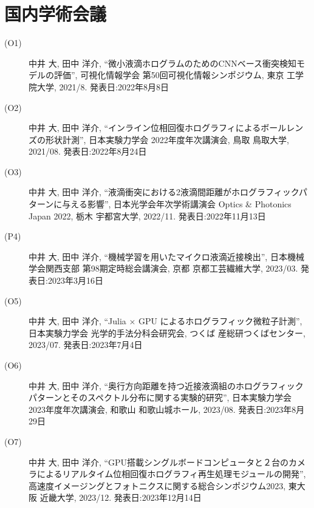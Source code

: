 \section*{国内学術会議}
\begin{description}
    \item[(O1)] 中井 大, 田中 洋介, “微小液滴ホログラムのためのCNNベース衝突検知モデルの評価”, 可視化情報学会 第50回可視化情報シンポジウム, 東京 工学院大学, 2021/8. 発表日:2022年8月8日
    \item[(O2)] 中井 大, 田中 洋介, “インライン位相回復ホログラフィによるボールレンズの形状計測”, 日本実験力学会 2022年度年次講演会, 鳥取 鳥取大学, 2021/08. 発表日:2022年8月24日
    \item[(O3)] 中井 大, 田中 洋介, “液滴衝突における2液滴間距離がホログラフィックパターンに与える影響”, 日本光学会年次学術講演会 Optics \& Photonics Japan 2022, 栃木 宇都宮大学, 2022/11. 発表日:2022年11月13日
    \item[(P4)] 中井 大, 田中 洋介, “機械学習を用いたマイクロ液滴近接検出”, 日本機械学会関西支部 第98期定時総会講演会, 京都 京都工芸繊維大学, 2023/03. 発表日:2023年3月16日
    \item[(O5)] 中井 大, 田中 洋介, “Julia × GPU によるホログラフィック微粒子計測”, 日本実験力学会 光学的手法分科会研究会, つくば 産総研つくばセンター, 2023/07. 発表日:2023年7月4日
    \item[(O6)] 中井 大, 田中 洋介, “奥行方向距離を持つ近接液滴組のホログラフィックパターンとそのスペクトル分布に関する実験的研究”, 日本実験力学会 2023年度年次講演会, 和歌山 和歌山城ホール, 2023/08. 発表日:2023年8月29日
    \item[(O7)] 中井 大, 田中 洋介, “GPU搭載シングルボードコンピュータと２台のカメラによるリアルタイム位相回復ホログラフィ再生処理モジュールの開発”, 高速度イメージングとフォトニクスに関する総合シンポジウム2023, 東大阪 近畿大学, 2023/12. 発表日:2023年12月14日
\end{description}